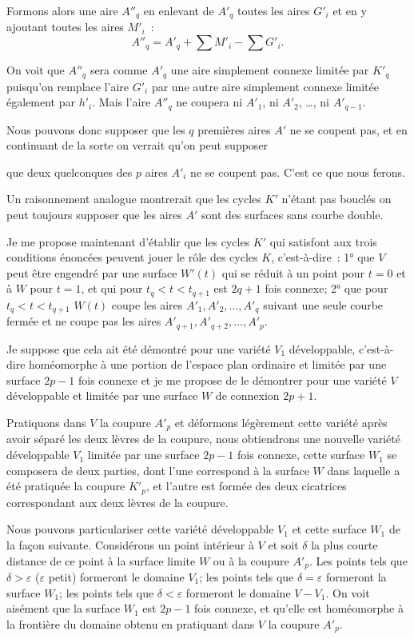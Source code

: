 \documentclass{article}
\begin{document}
Formons alors une aire $A''_{q}$ en enlevant de $A'_{q}$ toutes les aires $G'_{i}$ et en y ajoutant toutes les aires $M'_{i}$~:
\[ A''_{q} = A'_{q} + \sum M'_{i} - \sum G'_{i}. \]

On voit que $A''_{q}$ sera comme $A'_{q}$ une aire simplement connexe limitée par $K'_{q}$ puisqu'on remplace l'aire $G'_{i}$ par une autre aire simplement connexe limitée également par $h'_{i}$. Mais l'aire $A''_{q}$ ne coupera ni $A'_{1}$, ni $A'_{2}$, \ldots, ni $A'_{q-1}$.

Nous pouvons donc supposer que les $q$ premières aires $A'$ ne se coupent pas, et en continuant de la sorte on verrait qu'on peut supposer

que deux quelconques des $p$ aires $A'_{i}$ ne se coupent pas. C'est ce que nous ferons.

Un raisonnement analogue montrerait que les cycles $K'$ n'étant pas bouclés on peut toujours supposer que les aires $A'$ sont des surfaces sans courbe double.

Je me propose maintenant d'établir que les cycles $K'$ qui satisfont aux trois conditions énoncées peuvent jouer le rôle des cycles $K$, c'est-à-dire~: 1° que $V$ peut être engendré par une surface $W'(t)$ qui se réduit à un point pour $t = 0$ et à $W$ pour $t = 1$, et qui pour $t_{q} < t < t_{q+1}$ est $2q + 1$ fois connexe; 2° que pour $t_{q} < t < t_{q+1}$ $W(t)$ coupe les aires $A'_{1}, A'_{2}, \ldots, A'_{q}$ suivant une seule courbe fermée et ne coupe pas les aires $A'_{q+1}, A'_{q+2}, \ldots, A'_{p}$.

Je suppose que cela ait été démontré pour une variété $V_{1}$ développable, c'est-à-dire homéomorphe à une portion de l'espace plan ordinaire et limitée par une surface $2p - 1$ fois connexe et je me propose de le démontrer pour une variété $V$ développable et limitée par une surface $W$ de connexion $2p + 1$.

Pratiquons dans $V$ la coupure $A'_{p}$ et déformons légèrement cette variété après avoir séparé les deux lèvres de la coupure, nous obtiendrons une nouvelle variété développable $V_{1}$ limitée par une surface $2p - 1$ fois connexe, cette surface $W_{1}$ se composera de deux parties, dont l'une correspond à la surface $W$ dans laquelle a été pratiquée la coupure $K'_{p}$, et l'autre est formée des deux cicatrices correspondant aux deux lèvres de la coupure.

Nous pouvons particulariser cette variété développable $V_{1}$ et cette surface $W_{1}$ de la façon suivante. Considérons un point intérieur à $V$ et soit $\delta$ la plus courte distance de ce point à la surface limite $W$ ou à la coupure $A'_{p}$. Les points tels que $\delta > \varepsilon$ ($\varepsilon$ petit) formeront le domaine $V_{1}$; les points tels que $\delta = \varepsilon$ formeront la surface $W_{1}$; les points tels que $\delta < \varepsilon$ formeront le domaine $V - V_{1}$. On voit aisément que la surface $W_{1}$ est $2p - 1$ fois connexe, et qu'elle est homéomorphe à la frontière du domaine obtenu en pratiquant dans $V$ la coupure $A'_{p}$.
\end{document}
